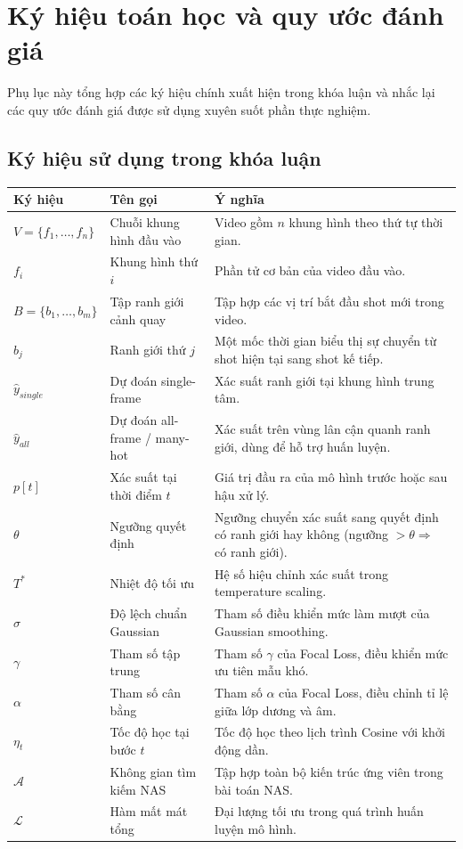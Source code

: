 \appendix

\chapter{Ký hiệu toán học và quy ước đánh giá}

Phụ lục này tổng hợp các ký hiệu chính xuất hiện trong khóa luận và nhắc lại các quy ước đánh giá được sử dụng xuyên suốt phần thực nghiệm.

\section{Ký hiệu sử dụng trong khóa luận}

\begin{table}[H]
\centering
\small
\renewcommand{\arraystretch}{1.2}
\begin{tabular}{L{2.4cm}L{5.0cm}L{6.0cm}}
\toprule
\textbf{Ký hiệu} & \textbf{Tên gọi} & \textbf{Ý nghĩa} \\
\midrule
$V=\{f_1,\dots,f_n\}$ & Chuỗi khung hình đầu vào & Video gồm $n$ khung hình theo thứ tự thời gian. \\
$f_i$ & Khung hình thứ $i$ & Phần tử cơ bản của video đầu vào. \\
$B=\{b_1,\dots,b_m\}$ & Tập ranh giới cảnh quay & Tập hợp các vị trí bắt đầu shot mới trong video. \\
$b_j$ & Ranh giới thứ $j$ & Một mốc thời gian biểu thị sự chuyển từ shot hiện tại sang shot kế tiếp. \\
$\hat{y}_{single}$ & Dự đoán single-frame & Xác suất ranh giới tại khung hình trung tâm. \\
$\hat{y}_{all}$ & Dự đoán all-frame / many-hot & Xác suất trên vùng lân cận quanh ranh giới, dùng để hỗ trợ huấn luyện. \\
$p[t]$ & Xác suất tại thời điểm $t$ & Giá trị đầu ra của mô hình trước hoặc sau hậu xử lý. \\
$\theta$ & Ngưỡng quyết định & Ngưỡng chuyển xác suất sang quyết định có ranh giới hay không (ngưỡng $> \theta \Rightarrow$ có ranh giới). \\
$T^*$ & Nhiệt độ tối ưu & Hệ số hiệu chỉnh xác suất trong temperature scaling. \\
$\sigma$ & Độ lệch chuẩn Gaussian & Tham số điều khiển mức làm mượt của Gaussian smoothing. \\
$\gamma$ & Tham số tập trung & Tham số $\gamma$ của Focal Loss, điều khiển mức ưu tiên mẫu khó. \\
$\alpha$ & Tham số cân bằng & Tham số $\alpha$ của Focal Loss, điều chỉnh tỉ lệ giữa lớp dương và âm. \\
$\eta_t$ & Tốc độ học tại bước $t$ & Tốc độ học theo lịch trình Cosine với khởi động dần. \\
$\mathcal{A}$ & Không gian tìm kiếm NAS & Tập hợp toàn bộ kiến trúc ứng viên trong bài toán NAS. \\
$\mathcal{L}$ & Hàm mất mát tổng & Đại lượng tối ưu trong quá trình huấn luyện mô hình. \\
\bottomrule
\end{tabular}
\end{table}

